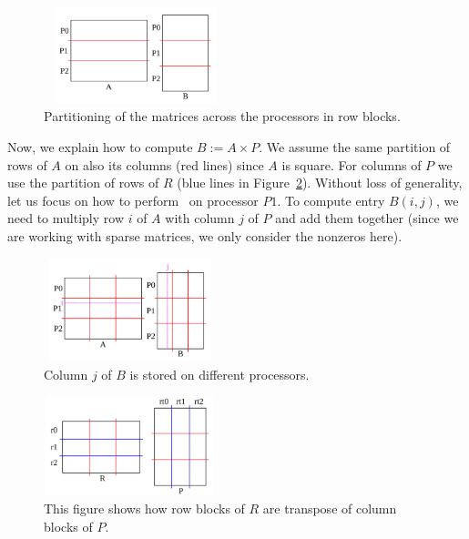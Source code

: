 \begin{figure}[tbh]
 \centering
 \includegraphics[width=5.3cm,height=2.8cm]{./figures/partition2.pdf}
 \caption{Partitioning of the matrices across the processors in row blocks.}
 \label{fig:partition}
 \Description{}
\end{figure}

Now, we explain how to compute $B := A \times P$. We assume the same partition of rows of $A$ on also its columns (red lines) since $A$ is square. For columns of $P$ we use the partition of rows of $R$ (blue lines in Figure~\ref{fig:part1b}).
Without loss of generality, let us focus on how to perform \mm ~on processor $P1$. To compute entry $B(i, j)$, we need to multiply row $i$ of $A$ with column $j$ of $P$ and add them together (since we are working with sparse matrices, we only consider the nonzeros here).

\begin{figure}[tbh]
    \centering
    \includegraphics[width=5cm,height=3cm]{./figures/partition3.pdf}
    \caption{Column $j$ of $B$ is stored on different processors.}
    \label{fig:part1b}
    \Description{}
\end{figure}

\begin{figure}[tbh]
    \centering
    \includegraphics[width=5cm,height=2.9cm]{./figures/part1c.pdf}
    \caption{This figure shows how row blocks of $R$ are transpose of column blocks of $P$.}
    \label{fig:part1c}
    \Description{}
\end{figure}

